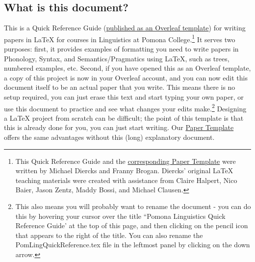 \documentclass{article}
\begin{document}

\subsection{What is this document?}

This is a Quick Reference Guide (\href{https://www.overleaf.com/latex/templates/pomona-linguistics-quick-reference-guide/jthrqbrktmrd}{published as an Overleaf template}) for writing papers in \LaTeX{} for courses in Linguistics at Pomona College.\footnote{This Quick Reference Guide and the \href{https://www.overleaf.com/latex/templates/pomona-linguistics-latex-template/bvdxdtpwysnd}{corresponding Paper Template} were written by Michael Diercks and Franny Brogan. Diercks' original \LaTeX{} teaching materials were created with assistance from Claire Halpert, Nico Baier, Jason Zentz, Maddy Bossi, and Michael Clausen.} It serves two purposes: first, it provides examples of formatting you need to write papers in Phonology, Syntax, and Semantics/Pragmatics using \LaTeX, such as trees, numbered examples, etc. Second, if you have opened this as an Overleaf template, a copy of this project is now in your Overleaf account, and you can now edit this document itself to be an actual paper that you write. This means there is no setup required, you can just erase this text and start typing your own paper, or use this document to practice and see what changes your edits make.\footnote{This also means you will probably want to rename the document - you can do this by hovering your cursor over the title ``Pomona Linguistics Quick Reference Guide' at the top of this page, and then clicking on the pencil icon that appears to the right of the title. You can also rename the PomLingQuickReference.tex file in the leftmost panel by clicking on the down arrow.} Designing a \LaTeX{} project from scratch can be difficult; the point of this template is that this is already done for you, you can just start writing. Our \href{https://www.overleaf.com/latex/templates/pomona-linguistics-latex-template/bvdxdtpwysnd}{Paper Template} offers the same advantages without this (long) explanatory document.
\end{document}
